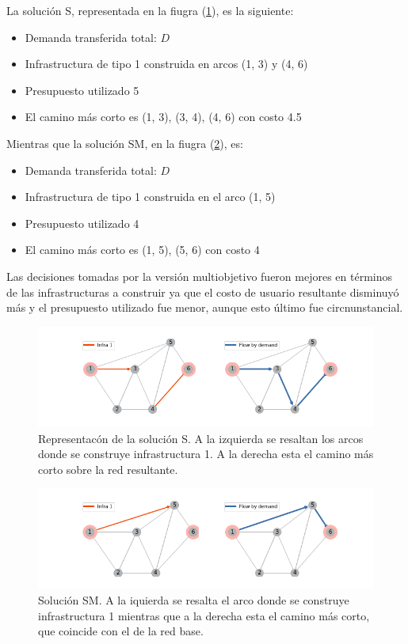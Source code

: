 \documentclass{article}
\begin{document}
  La solución S, representada en la fiugra (\ref{fig:example2solv2}), es la siguiente:

  \begin{itemize}
    \item{Demanda transferida total: $D$}
    \item{Infrastructura de tipo 1 construida en arcos (1, 3) y (4, 6)}
    \item{Presupuesto utilizado 5}
    \item{El camino más corto es (1, 3), (3, 4), (4, 6) con costo 4.5}
  \end{itemize}

  Mientras que la solución SM, en la fiugra (\ref{fig:example2solv1}), es:

  \begin{itemize}
    \item{Demanda transferida total: $D$}
    \item{Infrastructura de tipo 1 construida en el arco (1, 5)}
    \item{Presupuesto utilizado 4}
    \item{El camino más corto es (1, 5), (5, 6) con costo 4}
  \end{itemize}

  Las decisiones tomadas por la versión multiobjetivo fueron mejores en términos de las infrastructuras a construir ya que el costo de usuario resultante disminuyó más y el presupuesto utilizado fue menor, aunque esto último fue circnunstancial.

  \begin{figure}[h!]
    \centering
    \includegraphics[width=12cm]{../resources/example_2_sol_v2.png}
      \caption{Representacón de la solución S. A la izquierda se resaltan los arcos donde se construye infrastructura 1. A la derecha esta el camino más corto sobre la red resultante.}
    \label{fig:example2solv2}
  \end{figure}

  \begin{figure}[h!]
    \centering
    \includegraphics[width=12cm]{../resources/example_2_sol_v1.png}
      \caption{Solución SM. A la iquierda se resalta el arco donde se construye infrastructura 1 mientras que a la derecha esta el camino más corto, que coincide con el de la red base.}
    \label{fig:example2solv1}
  \end{figure}
\end{document}
